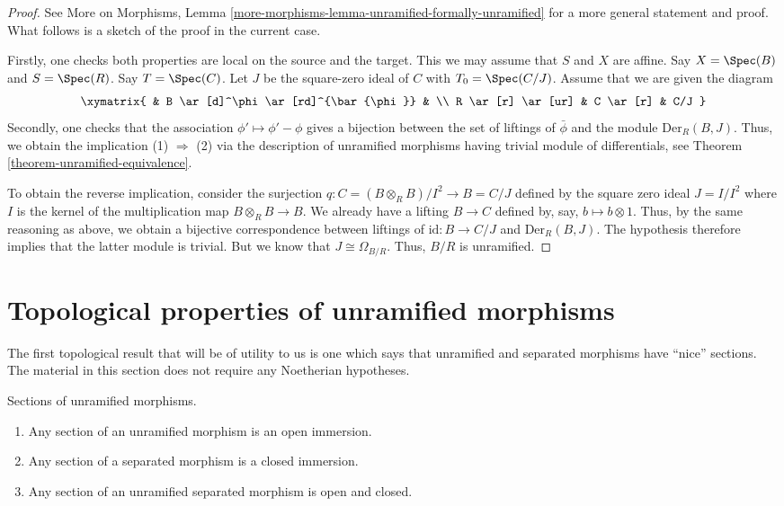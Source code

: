 \begin{proof}
See More on Morphisms,
Lemma \ref{more-morphisms-lemma-unramified-formally-unramified}
for a more general statement and proof.
What follows is a sketch of the proof in the current case.

\medskip\noindent
Firstly, one checks both properties are local on the source and the target.
This we may assume that $S$ and $X$ are affine.
Say $X = \Spec(B)$ and $S = \Spec(R)$.
Say $T = \Spec(C)$. Let $J$ be the square-zero ideal of $C$
with $T_0 = \Spec(C/J)$. Assume that we are given the diagram
$$
\xymatrix{
& B \ar[d]^\phi \ar[rd]^{\bar{\phi}}
& \\
R \ar[r] \ar[ur] & C \ar[r]
& C/J
}
$$
Secondly, one checks that the association $\phi' \mapsto \phi' - \phi$
gives a bijection between the set of liftings of $\bar{\phi}$ and the module
$\text{Der}_R(B, J)$. Thus, we obtain the implication (1) $\Rightarrow$ (2)
via the description of unramified morphisms having trivial module
of differentials, see Theorem \ref{theorem-unramified-equivalence}.

\medskip\noindent
To obtain the reverse implication, consider the surjection
$q : C = (B \otimes_R B)/I^2 \to B = C/J$ defined by the square zero ideal
$J = I/I^2$ where $I$ is the kernel of the multiplication map
$B \otimes_R B \to B$. We already have a lifting $B \to C$ defined by, say,
$b \mapsto b \otimes 1$. Thus, by the same reasoning as above, we obtain a
bijective correspondence between liftings of $\text{id} : B \to C/J$ and
$\text{Der}_R(B, J)$. The hypothesis therefore implies that the latter module is
trivial. But we know that $J \cong \Omega_{B/R}$. Thus, $B/R$ is unramified.
\end{proof}



\section{Topological properties of unramified morphisms}
\label{section-topological-unramified}

\noindent
The first topological result that will be of utility to us is one which says
that unramified and separated morphisms have ``nice'' sections.
The material in this section does not require any Noetherian hypotheses.

\begin{proposition}
\label{proposition-properties-sections}
Sections of unramified morphisms.
\begin{enumerate}
\item Any section of an unramified morphism is an open immersion.
\item Any section of a separated morphism is a closed immersion.
\item Any section of an unramified separated morphism is open and closed.
\end{enumerate}
\end{proposition}

